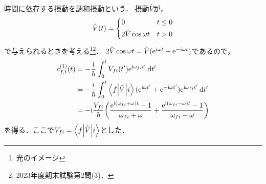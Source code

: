 \documentclass{report}
\begin{document}
  時間に依存する摂動を調和摂動という．
  摂動$\hat{V}$が，
  \begin{align}
    \hat{V}(t) = 
    \begin{dcases}
      0 & t\leq 0 \\
      2\hat{V}\cos\omega t & t > 0
    \end{dcases}
  \end{align}
  で与えられるときを考える\footnote{光のイメージ}\footnote{2023年度期末試験第2問(3)．}．
  $2\hat{V}\cos\omega t = \hat{V}(\mathrm{e}^{i\omega t} + \mathrm{e}^{-i\omega t})$であるので，
  \begin{align}
    c^{(1)}_{f, i}(t) &= -\frac{\mathrm{i}}{\hbar}\int_{0}^{t}V_{fi}(t')\mathrm{e}^{\mathrm{i}\omega_{fi}t'}\dd{t'} \\ 
    &= -\frac{i}{\hbar}\int_{0}^{t}\mel**{f}{\hat{V}}{i}(\mathrm{e}^{\mathrm{i}\omega t'} + \mathrm{e}^{-\mathrm{i}\omega t'})\mathrm{e}^{\mathrm{i}\omega_{fi}t'}\dd{t'} \\
    &= -\mathrm{i}\frac{V_{fi}}{\hbar}\qty(\frac{\mathrm{e}^{\mathrm{i}(\omega_{fi} + \omega)t} - 1}{\omega_{fi} + \omega} + \frac{\mathrm{e}^{\mathrm{i}(\omega_{fi} - \omega)t} - 1}{\omega_{fi} - \omega})\label{harmonic-perturbation-cnt}
  \end{align}
  を得る．ここで$V_{fi} = \mel**{f}{\hat{V}}{i}$とした．
\end{document}
